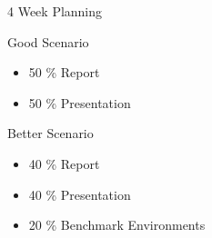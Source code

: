 \begin{frame}[fragile]{4 Week Planning}
  \begin{block}{Good Scenario}
    \begin{itemize}
      \item 50 \% Report \\
      \item 50 \% Presentation
    \end{itemize}
  \end{block}\pause

  \begin{exampleblock}{Better Scenario}
    \begin{itemize}
      \item 40 \% Report \\
      \item 40 \% Presentation \\
      \item 20 \% Benchmark Environments
    \end{itemize}
   \end{exampleblock}
\end{frame}


